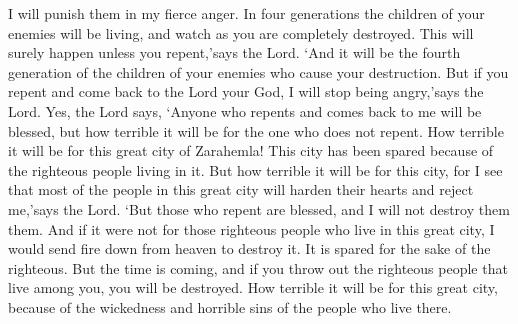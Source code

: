 I will punish them in my fierce anger. In four generations the children of your enemies will be living, and watch as you are completely destroyed. This will surely happen unless you repent,\rq says the Lord. \lq And it will be the fourth generation of the children of your enemies who cause your destruction.
\bverse \iffalse But if ye will repent and return unto the Lord your God I will turn away mine anger, saith the Lord; yea, thus saith the Lord, blessed are they who will repent and turn unto me, but wo unto him that repenteth not. \fi
But if you repent and come back to the Lord your God, I will stop being angry,\rq says the Lord. Yes, the Lord says, \lq Anyone who repents and comes back to me will be blessed, but how terrible it will be for the one who does not repent.
\bverse \iffalse Yea, wo unto this great city of Zarahemla; for behold, it is because of those who are righteous that it is saved; yea, wo unto this great city, for I perceive, saith the Lord, that there are many, yea, even the more part of this great city, that will harden their hearts against me, saith the Lord. \fi
How terrible it will be for this great city of Zarahemla! This city has been spared because of the righteous people living in it. But how terrible it will be for this city, for I see that most of the people in this great city will harden their hearts and reject me,\rq says the Lord.
\bverse \iffalse But blessed are they who will repent, for them will I spare.  But behold, if it were not for the righteous who are in this great city, behold, I would cause that fire should come down out of heaven and destroy it. \fi
\lq But those who repent are blessed, and I will not destroy them them. And if it were not for those righteous people who live in this great city, I would send fire down from heaven to destroy it.
\bverse \iffalse But behold, it is for the righteous' sake that it is spared.  But behold, the time cometh, saith the Lord, that when ye shall cast out the righteous from among you, then shall ye be ripe for destruction; yea, wo be unto this great city, because of the wickedness and abominations which are in her. \fi
It is spared for the sake of the righteous. But the time is coming, and if you throw out the righteous people that live among you, you will be destroyed. How terrible it will be for this great city, because of the wickedness and horrible sins of the people who live there.
\bverse \iffalse Yea, and wo be unto the city of Gideon, for the wickedness and abominations which are in her. \fi

